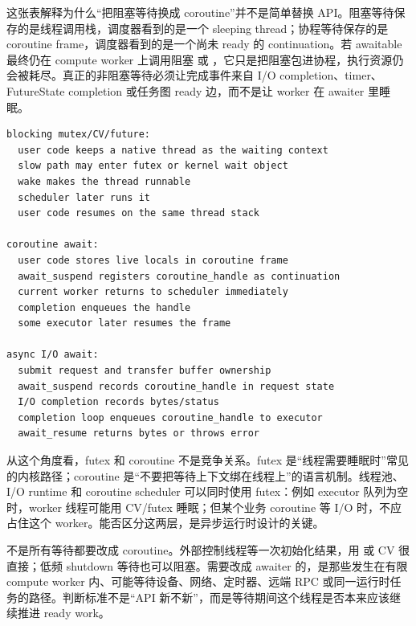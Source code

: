 这张表解释为什么“把阻塞等待换成 coroutine”并不是简单替换 API。阻塞等待保存的是线程调用栈，调度器看到的是一个 sleeping thread；协程等待保存的是 coroutine frame，调度器看到的是一个尚未 ready 的 continuation。若 awaitable 最终仍在 compute worker 上调用阻塞  或 ，它只是把阻塞包进协程，执行资源仍会被耗尽。真正的非阻塞等待必须让完成事件来自 I/O completion、timer、FutureState completion 或任务图 ready 边，而不是让 worker 在 awaiter 里睡眠。

\begin{lstlisting}[numbers=none,caption={等待机制选择的底层事件链}]
blocking mutex/CV/future:
  user code keeps a native thread as the waiting context
  slow path may enter futex or kernel wait object
  wake makes the thread runnable
  scheduler later runs it
  user code resumes on the same thread stack

coroutine await:
  user code stores live locals in coroutine frame
  await_suspend registers coroutine_handle as continuation
  current worker returns to scheduler immediately
  completion enqueues the handle
  some executor later resumes the frame

async I/O await:
  submit request and transfer buffer ownership
  await_suspend records coroutine_handle in request state
  I/O completion records bytes/status
  completion loop enqueues coroutine_handle to executor
  await_resume returns bytes or throws error
\end{lstlisting}

从这个角度看，futex 和 coroutine 不是竞争关系。futex 是“线程需要睡眠时”常见的内核路径；coroutine 是“不要把等待上下文绑在线程上”的语言机制。线程池、I/O runtime 和 coroutine scheduler 可以同时使用 futex：例如 executor 队列为空时，worker 线程可能用 CV/futex 睡眠；但某个业务 coroutine 等 I/O 时，不应占住这个 worker。能否区分这两层，是异步运行时设计的关键。

不是所有等待都要改成 coroutine。外部控制线程等一次初始化结果，用  或 CV 很直接；低频 shutdown 等待也可以阻塞。需要改成 awaiter 的，是那些发生在有限 compute worker 内、可能等待设备、网络、定时器、远端 RPC 或同一运行时任务的路径。判断标准不是“API 新不新”，而是等待期间这个线程是否本来应该继续推进 ready work。

